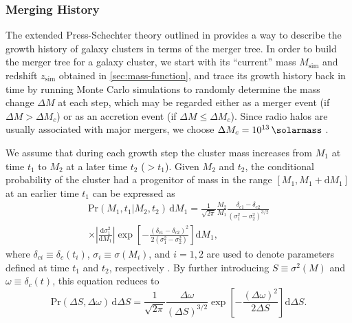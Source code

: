 \documentclass[twocolumn]{aastex62}
\newcommand{\R}[1]{\mathrm{#1}}
\newcommand{\D}[1]{\R{d} #1}
\newcommand{\diff}[2]{\frac{\D{#1}}{\D{#2}}}
\begin{document}
\subsubsection{Merging History}
\label{sec:merging-history}

The extended Press-Schechter theory outlined in \citet{lacey1993} provides
a way to describe the growth history of galaxy clusters in terms of the
merger tree.
In order to build the merger tree for a galaxy cluster, we start with
its \enquote{current} mass $M_{\R{sim}}$ and redshift $z_{\R{sim}}$ obtained
in \autoref{sec:mass-function}, and trace its growth history back in time
by running Monte Carlo simulations to randomly determine the mass change
$\Delta M$ at each step, which may be regarded either as a merger event
(if $\Delta M > \Delta M_c$) or as an accretion event
(if $\Delta M \leq \Delta M_c$).
Since radio halos are usually associated with major mergers, we choose
$\Delta M_c = \SI{e13}{\solarmass}$ \citep[e.g.,][]{cassano2005}.

We assume that during each growth step the cluster mass increases
from $M_1$ at time $t_1$ to $M_2$ at a later time $t_2$ ($> t_1$).
Given $M_2$ and $t_2$, the conditional probability of the cluster had
a progenitor of mass in the range $[M_1, M_1 + \D{M_1}]$ at an earlier
time $t_1$ can be expressed as
\begin{multline}
  \label{eq:eps-condprob}
  \R{Pr}(M_1, t_1 | M_2, t_2) \,\D{M_1} =
    \frac{1}{\sqrt{2\pi}} \frac{M_2}{M_1}
    \frac{\delta_{c1} - \delta_{c2}}{(\sigma_1^2 - \sigma_2^2)^{3/2}} \\
    \times \left| \diff{\sigma_1^2}{M_1} \right|
    \exp \!\left[ -\frac{(\delta_{c1} - \delta_{c2})^2}
      {2(\sigma_1^2 - \sigma_2^2)} \right] \D{M_1},
\end{multline}
where
$\delta_{ci} \equiv \delta_c(t_i)$, $\sigma_i \equiv \sigma(M_i)$, and
$i = 1, 2$ are used to denote parameters defined at time $t_1$ and $t_2$,
respectively \citep{lacey1993,randall2002}.
By further introducing $S \equiv \sigma^2(M)$ and
$\omega \equiv \delta_c(t)$, this equation reduces to
\begin{equation}
  \label{eq:eps-condprob-simp}
  \R{Pr}(\Delta S, \Delta \omega) \,\D{\Delta S} = \frac{1}{\sqrt{2\pi}}
  \frac{\Delta\omega}{(\Delta S)^{3/2}}
  \exp \!\left[ -\frac{(\Delta\omega)^2}{2 \Delta S} \right] \D{\Delta S}.
\end{equation}
\end{document}

